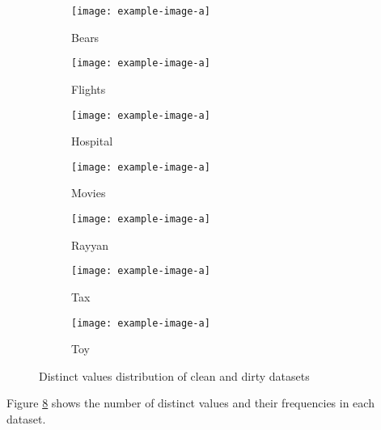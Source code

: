 \begin{figure}[!t]
    \centering 
    \centering
\begin{subfigure}{0.4\textwidth}
    \texttt{[image: example-image-a]}
    \caption{\label{exp:d1}Bears}
    \label{exp:distincts_bears}
\end{subfigure}
\hfill
\begin{subfigure}{0.4\textwidth}
    \texttt{[image: example-image-a]}
    \caption{Flights}
    \label{exp:distincts_flights}
\end{subfigure}
\hfill
\begin{subfigure}{0.4\textwidth}
    \texttt{[image: example-image-a]}
    \caption{Hospital}
    \label{fig:distincts_hospitals}
\end{subfigure}
\hfill
\begin{subfigure}{0.4\textwidth}
    \texttt{[image: example-image-a]}
    \caption{Movies}
    \label{exp:distincts_movies}
\end{subfigure}
\hfill
\begin{subfigure}{0.4\textwidth}
    \texttt{[image: example-image-a]}
    \caption{Rayyan}
    \label{exp:distincts_rayyan}
\end{subfigure}
\hfill
\begin{subfigure}{0.4\textwidth}
    \texttt{[image: example-image-a]}
    \caption{Tax}
    \label{exp:distincts_tax}
\end{subfigure}
\hfill
\begin{subfigure}{0.4\textwidth}
    \texttt{[image: example-image-a]}
    \caption{Toy}
    \label{exp:distincts_toy}
\end{subfigure}
        
\caption{Distinct values distribution of clean and dirty datasets}
\label{exp:distinct_values_datasets}
\end{figure}
Figure \ref{exp:distinct_values_datasets} shows the number of distinct values and their frequencies in each dataset. 


